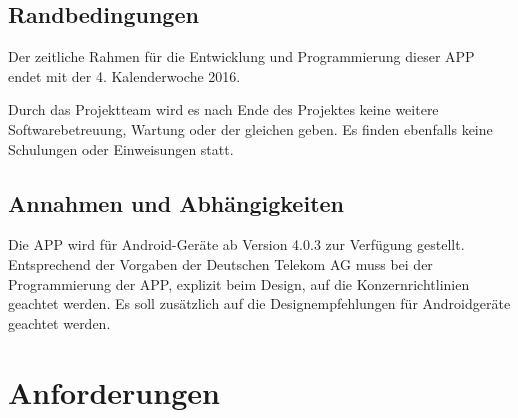 \subsection{\textbf{Randbedingungen}}

Der zeitliche Rahmen für die Entwicklung und Programmierung dieser APP endet mit der 4. Kalenderwoche 2016.

Durch das Projektteam wird es nach Ende des Projektes keine weitere Softwarebetreuung, Wartung oder der gleichen geben. Es finden ebenfalls keine Schulungen oder Einweisungen statt.

\subsection{\textbf{Annahmen und Abhängigkeiten}}

Die APP wird für Android-Geräte ab Version 4.0.3 zur Verfügung gestellt.
Entsprechend der Vorgaben der Deutschen Telekom AG muss bei der Programmierung der APP, explizit beim Design, auf die Konzernrichtlinien geachtet werden. Es soll zusätzlich auf die Designempfehlungen für Androidgeräte geachtet werden.

%

%
%

\section{Anforderungen}

